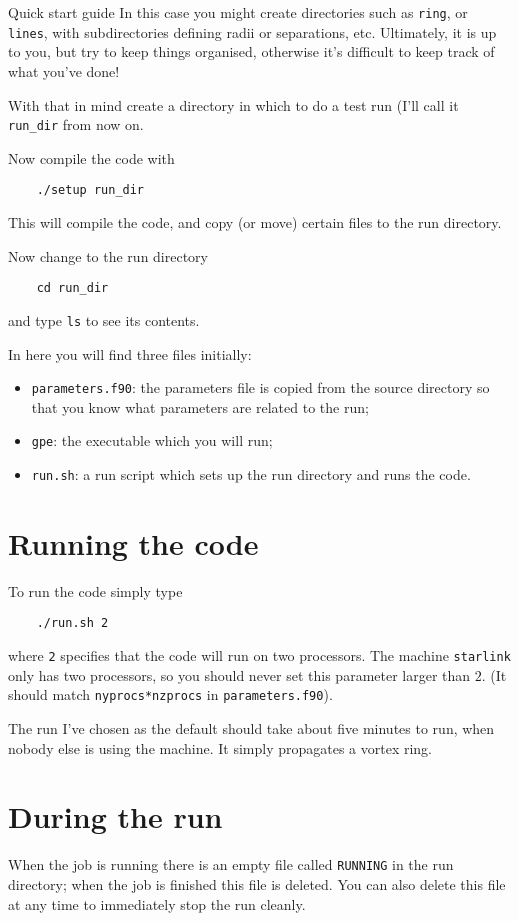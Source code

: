 \begin{chapter}{\label{cha:quickstart} Quick start guide}
  In this case you might create directories such as \verb"ring", or
  \verb"lines", with subdirectories defining radii or separations, etc.
  Ultimately, it is up to you, but try to keep things organised, otherwise it's
  difficult to keep track of what you've done!

  With that in mind create a directory in which to do a test run (I'll call it
  \verb"run_dir" from now on.

  Now compile the code with
  \begin{Verbatim}
    ./setup run_dir
  \end{Verbatim}
  This will compile the code, and copy (or move) certain files to the run
  directory.

  Now change to the run directory
  \begin{Verbatim}
    cd run_dir
  \end{Verbatim}
  and type \verb"ls" to see its contents.

  In here you will find three files initially:
  \begin{itemize}
    \item \verb"parameters.f90": the parameters file is copied from the source
      directory so that you know what parameters are related to the run;
    \item \verb"gpe": the executable which you will run;
    \item \verb"run.sh": a run script which sets up the run directory and runs
      the code.
  \end{itemize}
  \section{Running the code}
  To run the code simply type
  \begin{Verbatim}
    ./run.sh 2
  \end{Verbatim}
  where \verb"2" specifies that the code will run on two processors.  The
  machine \verb"starlink" only has two processors, so you should never set this
  parameter larger than $2$.  (It should match \verb"nyprocs*nzprocs" in
  \verb"parameters.f90").

  The run I've chosen as the default should take about five minutes to run,
  when nobody else is using the machine.  It simply propagates a vortex ring.

  \section{During the run}
  When the job is running there is an empty file called \verb"RUNNING" in the
  run directory; when the job is finished this file is deleted.  You can also
  delete this file at any time to immediately stop the run cleanly.


\end{chapter}
